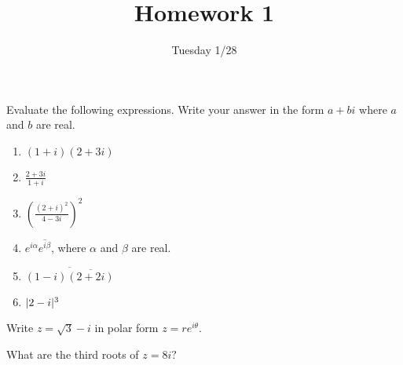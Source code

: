 \documentclass{../math135}
\title{Homework 1}
\author{}
\date{Tuesday 1/28}
\begin{document}
\begin{exercise}
	Evaluate the following expressions.  Write your answer in the form
  \(a + bi\) where \(a\) and \(b\) are real.
	\begin{enumerate}
  \item \((1+i)(2+3i)\)

    \begin{solution}
    \end{solution}

  \item \(\frac{2+3i}{1+i}\)

    \begin{solution}
    \end{solution}

  \item \(\left(\frac{(2+i)^2}{4-3i}\right)^2\)

    \begin{solution}
    \end{solution}

  \item \(e^{i\alpha} \overline{e^{i\beta}}\), where \(\alpha\) and
    \(\beta\) are real.

    \begin{solution}
    \end{solution}

  \item \(\overline{(1-i)\overline{(2+2i)}}\)

    \begin{solution}
    \end{solution}

  \item \(\lvert2-i\rvert^3\)

    \begin{solution}
    \end{solution}

	\end{enumerate}
\end{exercise}

\begin{exercise}
	Write \(z = \sqrt{3}-i\) in polar form \(z = re^{i\theta}\).

  \begin{solution}
  \end{solution}

\end{exercise}

\begin{exercise}
	What are the third roots of \(z=8i?\)

  \begin{solution}
  \end{solution}

\end{exercise}
\end{document}
